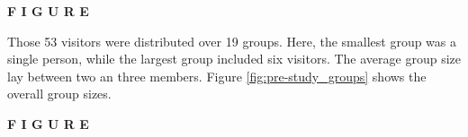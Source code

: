 \textbf{F I G U R E}

Those 53 visitors were distributed over 19 groups. Here, the smallest group was a single person, while the largest group included six visitors. The average group size lay between two an three members. Figure \ref{fig:pre-study_groups} shows the overall group sizes.

\textbf{F I G U R E}

